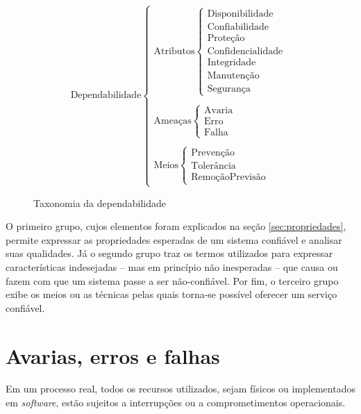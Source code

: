 \begin{figure}[htb]
\centering
\footnotesize
\[
\text{Dependabilidade}
\left\{
\begin{array}{l}
\text{Atributos}
    \left\{
    \begin{array}{l}
        \text{Disponibilidade}\\
        \text{Confiabilidade}\\
        \text{Proteção}\\
        \text{Confidencialidade}\\
        \text{Integridade}\\
        \text{Manutenção}\\
        \text{Segurança}
    \end{array}
    \right.
\\
\\
\text{Ameaças}
    \left\{
    \begin{array}{l}
        \text{Avaria}\\
        \text{Erro}\\
        \text{Falha}
    \end{array}
    \right.
\\
\\
\text{Meios}
    \left\{
    \begin{array}{l}
        \text{Prevenção}\\
        \text{Tolerância}\\
        \text{Remoção}
        \text{Previsão}
    \end{array}
    \right.
\end{array}
\right.
\]
\caption{Taxonomia da dependabilidade}
\label{fig:div_avizienis}
\end{figure}

O primeiro grupo, cujos elementos foram explicados na seção
\ref{sec:propriedades}, permite expressar as propriedades esperadas de um
sistema confiável e analisar suas qualidades. Já o segundo grupo traz os termos
utilizados para expressar características indesejadas -- mas em princípio não
inesperadas -- que causa ou fazem com que um sistema passe a ser não-confiável.
Por fim, o terceiro grupo exibe os meios ou as técnicas pelas quais torna-se
possível oferecer um serviço confiável.

\section{Avarias, erros e falhas}\label{sec:avaria_erro_falha}
Em um processo real, todos os recursos utilizados, sejam físicos ou
implementados em {\it software}, estão sujeitos a interrupções ou a
comprometimentos operacionais.

